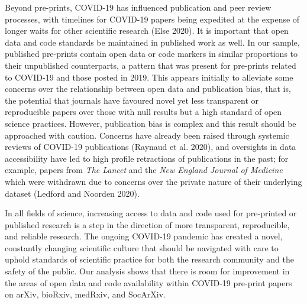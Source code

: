 \documentclass[
]{article}
\begin{document}
Beyond pre-prints, COVID-19 has influenced publication and peer review processes, with timelines for COVID-19 papers being expedited at the expense of longer waits for other scientific research (Else 2020). It is important that open data and code standards be maintained in published work as well. In our sample, published pre-prints contain open data or code markers in similar proportions to their unpublished counterparts, a pattern that was present for pre-prints related to COVID-19 and those posted in 2019. This appears initially to alleviate some concerns over the relationship between open data and publication bias, that is, the potential that journals have favoured novel yet less transparent or reproducible papers over those with null results but a high standard of open science practices. However, publication bias is complex and this result should be approached with caution. Concerns have already been raised through systemic reviews of COVID-19 publications (Raynaud et al. 2020), and oversights in data accessibility have led to high profile retractions of publications in the past; for example, papers from \emph{The Lancet} and the \emph{New England Journal of Medicine} which were withdrawn due to concerns over the private nature of their underlying dataset (Ledford and Noorden 2020).

In all fields of science, increasing access to data and code used for pre-printed or published research is a step in the direction of more transparent, reproducible, and reliable research. The ongoing COVID-19 pandemic has created a novel, constantly changing scientific culture that should be navigated with care to uphold standards of scientific practice for both the research community and the safety of the public. Our analysis shows that there is room for improvement in the areas of open data and code availability within COVID-19 pre-print papers on arXiv, bioRxiv, medRxiv, and SocArXiv.
\end{document}
